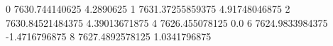 0 7630.744140625 4.2890625
1 7631.37255859375 4.91748046875
2 7630.84521484375 4.39013671875
4 7626.455078125 0.0
6 7624.9833984375 -1.4716796875
8 7627.4892578125 1.0341796875
